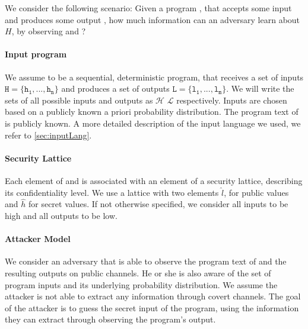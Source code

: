 We consider the following scenario: Given a program \p, that accepts some input \In and produces some output \Out, how much information can an adversary \A learn about $H$, by observing \p and \Out?

\paragraph{Input program} We assume \p to be a sequential, deterministic program, that receives a set of inputs $\mathtt{H = \{h_1, ..., h_n\}}$ and produces a set of outputs $\mathtt{L = \{l_1, ..., l_m\}}$. We will write the sets of all possible inputs and outputs as $\mathcal{H}$ $\mathcal{L}$ respectively. Inputs are chosen based on a publicly known a priori probability distribution. The program text of \p is publicly known. A more detailed description of the input language we used, we refer to \ref{sec:inputLang}.

\paragraph{Security Lattice} Each element of \In and \Out is associated with an element of a security lattice, describing its confidentiality level. We use a lattice with two elements $\hat{l}$, for public values and $\hat{h}$ for secret values. If not otherwise specified, we consider all inputs to be high and all outputs to be low.

\paragraph{Attacker Model} We consider an adversary \A that is able to observe the program text of \p and the resulting outputs on public channels. He or she is also aware of the set of program inputs and its underlying probability distribution. We assume the attacker is not able to extract any information through covert channels. The goal of the attacker is to guess the secret input of the program, using the information they can extract through observing the program's output.



